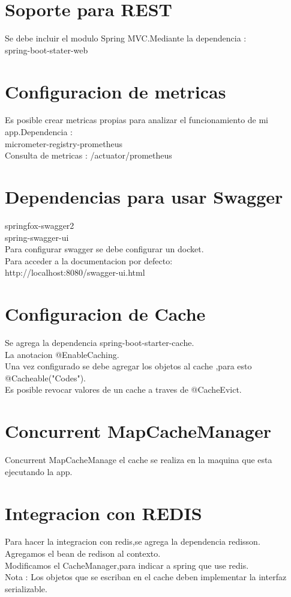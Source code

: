 \section{Soporte para REST}
Se debe incluir el modulo Spring MVC.Mediante la dependencia : \\
spring-boot-stater-web
\section{Configuracion de metricas}
Es posible crear metricas propias para analizar el funcionamiento de mi app.Dependencia : \\
micrometer-registry-prometheus\\
Consulta de metricas : /actuator/prometheus
\section{Dependencias para usar Swagger}
springfox-swagger2\\
spring-swagger-ui\\
Para configurar swagger se debe configurar un docket.\\
Para acceder a la documentacion por defecto:\\
http://localhost:8080/swagger-ui.html
\section{Configuracion de Cache}
Se agrega la dependencia spring-boot-starter-cache.\\
La anotacion @EnableCaching.\\
Una vez configurado se debe agregar los objetos al cache ,para esto @Cacheable("Codes").\\
Es posible revocar valores de un cache a traves de @CacheEvict.
\section{Concurrent MapCacheManager}
Concurrent MapCacheManage el cache se realiza en la maquina que esta ejecutando la app.
\section{Integracion con REDIS}
Para hacer la integracion con redis,se agrega la dependencia redisson.\\
Agregamos el bean de redison al contexto.\\
Modificamos el CacheManager,para indicar a spring que use redis.\\
Nota : Los objetos que se escriban en el cache deben implementar la interfaz serializable.
